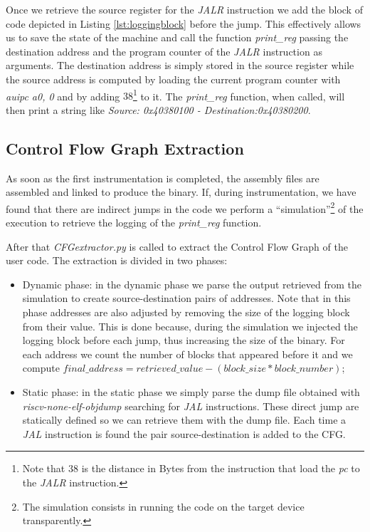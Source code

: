 Once we retrieve the source register for the \textit{JALR} instruction we add
the block of code depicted in Listing \ref{lst:loggingblock} before the jump. This
effectively allows us to save the state of the machine and call the function \textit{print\_reg}
passing the destination address and the program counter of the \textit{JALR} instruction
as arguments. The destination address is simply stored in the source register
while the source address is computed by loading the current program counter with
\textit{auipc a0, 0} and by adding $38$\footnote{Note that $38$ is the distance
in Bytes from the instruction that load the \textit{pc} to the \textit{JALR}
instruction.} to it. The \textit{print\_reg} function, when called, will then
print a string like \textit{Source: 0x40380100 - Destination:0x40380200}.

\subsection{Control Flow Graph Extraction}
\label{subsec:project_cfgextraction}

As soon as the first instrumentation is completed, the assembly files are assembled
and linked to produce the binary. If, during instrumentation, we have found that
there are indirect jumps in the code we perform a ``simulation''\footnote{The
simulation consists in running the code on the target device transparently.} of the
execution to retrieve the logging of the \textit{print\_reg} function.

After that \textit{CFGextractor.py} is called to extract the Control Flow Graph of
the user code. The extraction is divided in two phases:
\begin{itemize}
  \item Dynamic phase: in the dynamic phase we parse the output retrieved from
    the simulation to create source-destination pairs of addresses. Note that in
    this phase addresses are also adjusted by removing the size of the logging block
    from their value. This is done because, during the simulation we injected the
    logging block before each jump, thus increasing the size of the binary. For each
    address we count the number of blocks that appeared before it and we compute
    $\textit{final\_address}= \textit{retrieved\_value}- (\textit{block\_size}* \textit
    {block\_number})$;

  \item Static phase: in the static phase we simply parse the dump file obtained
    with \textit{riscv-none-elf-objdump} searching for \textit{JAL} instructions.
    These direct jump are statically defined so we can retrieve them with the dump
    file. Each time a \textit{JAL} instruction is found the pair source-destination
    is added to the CFG.
\end{itemize}


